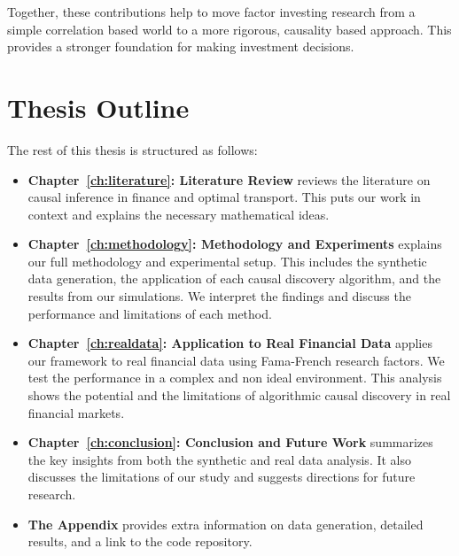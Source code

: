 Together, these contributions help to move factor investing research from a simple correlation based world to a more rigorous, causality based approach. This provides a stronger foundation for making investment decisions.

\section{Thesis Outline}

The rest of this thesis is structured as follows:
\begin{itemize}
    \item \textbf{Chapter~\ref{ch:literature}: Literature Review} reviews the literature on causal inference in finance and optimal transport. This puts our work in context and explains the necessary mathematical ideas.
    
    \item \textbf{Chapter~\ref{ch:methodology}: Methodology and Experiments} explains our full methodology and experimental setup. This includes the synthetic data generation, the application of each causal discovery algorithm, and the results from our simulations. We interpret the findings and discuss the performance and limitations of each method.
    
    \item \textbf{Chapter~\ref{ch:realdata}: Application to Real Financial Data} applies our framework to real financial data using Fama-French research factors. We test the performance in a complex and non ideal environment. This analysis shows the potential and the limitations of algorithmic causal discovery in real financial markets.
    
    \item \textbf{Chapter~\ref{ch:conclusion}: Conclusion and Future Work} summarizes the key insights from both the synthetic and real data analysis. It also discusses the limitations of our study and suggests directions for future research.
    
    \item \textbf{The Appendix} provides extra information on data generation, detailed results, and a link to the code repository\cite{AlameriGitHub2025}.
\end{itemize}
